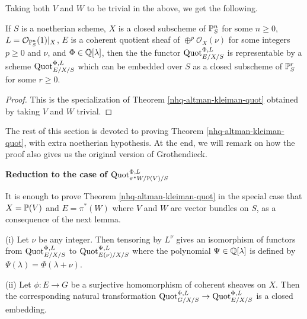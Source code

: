Taking both $V$ and $W$ to be trivial in the above, we get the following.

\begin{theorem}\label{nhq-projective-space-special-case}
If $S$ is a noetherian scheme, $X$ is a closed subscheme of
$\mathbb{P}^n_S$ for some $n\ge 0$, $L = {\mathcal O}_{\mathbb{P}^n_S}(1)|_X$,
$E$ is a coherent quotient sheaf of $\oplus^p {\mathcal O}_X(\nu)$
for some integers $p\ge 0$ and $\nu$, and $\Phi \in \mathbb{Q}[\lambda]$,
then the the functor $\operatorname{Quot}_{E/X/S}^{\Phi,L}$ is representable
by a scheme $\operatorname{Quot}_{E/X/S}^{\Phi,L}$ which can be embedded over $S$ as a
closed subscheme of $\mathbb{P}^r_S$ for some $r\ge 0$.
\end{theorem}

\begin{proof}
This is the specialization of Theorem \ref{nhq-altman-kleiman-quot}
obtained by taking $V$ and $W$ trivial.
\end{proof}


The rest of this section is devoted to proving
Theorem \ref{nhq-altman-kleiman-quot}, with extra noetherian hypothesis.
At the end, we will remark on how the proof also
gives us the original version of Grothendieck.






\bigskip

\centerline{\large\bf Reduction to the case of
$\operatorname{Quot}_{\pi^*W/\mathbb{P}(V)/S}^{\Phi,L}$}

\medskip


It is enough to prove Theorem \ref{nhq-altman-kleiman-quot} in the special case
that $X = \mathbb{P}(V)$ and
$E= \pi^*(W)$ where $V$ and $W$ are vector bundles on $S$, as
a consequence of the next lemma.

\begin{lemma}\label{nhq-quot-reduction-lemma}
(i) Let $\nu$ be any integer.
Then tensoring by $L^{\nu}$ gives an isomorphism of
functors from $\operatorname{Quot}_{E/X/S}^{\Phi,L}$ to
$\operatorname{Quot}_{E(\nu)/X/S}^{\Psi,L}$ where the polynomial
$\Psi \in \mathbb{Q}[\lambda]$ is defined by $\Psi(\lambda) = \Phi(\lambda + \nu)$.

(ii) Let $\phi : E \to G$ be a surjective homomorphism of
coherent sheaves on $X$. Then the corresponding natural transformation
$\operatorname{Quot}_{G/X/S}^{\Phi,L} \to \operatorname{Quot}_{E/X/S}^{\Phi,L}$
is a closed embedding.
\end{lemma}

